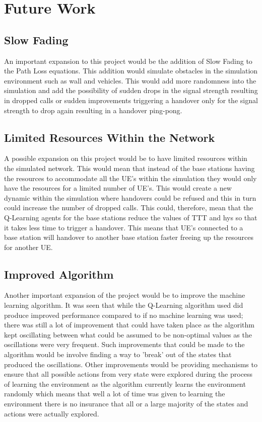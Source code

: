 \chapter{Future Work}\label{future work}
\section{Slow Fading}
An important expansion to this project would be the addition of Slow Fading to the Path Loss equations. This addition would simulate obstacles in the simulation environment such as wall and vehicles. This would add more randomness into the simulation and add the possibility of sudden drops in the signal strength resulting in dropped calls or sudden improvements triggering a handover only for the signal strength to drop again resulting in a handover ping-pong.

\section{Limited Resources Within the Network}
A possible expansion on this project would be to have limited resources within the simulated network. This would mean that instead of the base stations having the resources to accommodate all the UE's within the simulation they would only have the resources for a limited number of UE's. This would create a new dynamic within the simulation where handovers could be refused and this in turn could increase the number of dropped calls. This could, therefore, mean that the Q-Learning agents for the base stations reduce the values of TTT and hys so that it takes less time to trigger a handover. This means that UE's connected to a base station will handover to another base station faster freeing up the resources for another UE. 

\section{Improved Algorithm}
Another important expansion of the project would be to improve the machine learning algorithm. It was seen that while the Q-Learning algorithm used did produce improved performance compared to if no machine learning was used; there was still a lot of improvement that could have taken place as the algorithm kept oscillating between what could be assumed to be non-optimal values as the oscillations were very frequent. Such improvements that could be made to the algorithm would be involve finding a way to 'break' out of the states that produced the oscillations. Other improvements would be providing mechanisms to ensure that all possible actions from very state were explored during the process of learning the environment as the algorithm currently learns the environment randomly which means that well a lot of time was given to learning the environment there is no insurance that all or a large majority of the states and actions were actually explored.
